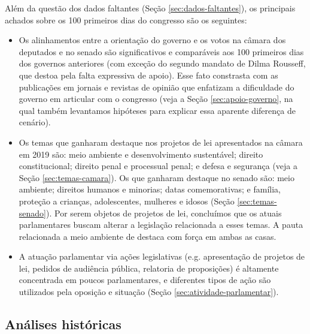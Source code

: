 \documentclass[12pt,a4paper]{article}
\begin{document}
Além da questão dos dados faltantes (Seção \ref{sec:dados-faltantes}), os principais achados
sobre os 100 primeiros dias do congresso são os seguintes:

\begin{itemize}

\item Os alinhamentos entre a orientação do governo e os votos na câmara dos deputados e no senado são significativos e
  comparáveis aos 100 primeiros dias dos governos anteriores (com exceção do segundo mandato de Dilma Rousseff,
  que destoa pela falta expressiva de apoio). Esse fato constrasta com as publicações em jornais e revistas
  de opinião que enfatizam a dificuldade do governo em articular com o congresso (veja a Seção \ref{sec:apoio-governo}, na qual também levantamos hipóteses para explicar essa aparente diferença de cenário).

\item Os temas que ganharam destaque nos projetos de lei apresentados na câmara em 2019 são: meio ambiente e desenvolvimento
  sustentável; direito constitucional; direito penal e processual penal; e defesa e segurança
  (veja a Seção \ref{sec:temas-camara}). Os que ganharam
  destaque no senado são: meio ambiente; direitos humanos e minorias; datas comemorativas; e família, proteção a crianças,
  adolescentes, mulheres e idosos (Seção \ref{sec:temas-senado}). 
  Por serem objetos de projetos de lei, concluímos que os atuais parlamentares
  buscam alterar a legislação relacionada a esses temas. A pauta relacionada a meio ambiente de destaca com força
  em ambas as casas.

\item A atuação parlamentar via ações legislativas (e.g. apresentação de projetos de lei, pedidos de
audiência pública, relatoria de proposições) é altamente concentrada em poucos parlamentares, e diferentes tipos de ação são utilizados pela oposição e situação (Seção \ref{sec:atividade-parlamentar}).

\end{itemize}

\subsection{Análises históricas}
\end{document}
